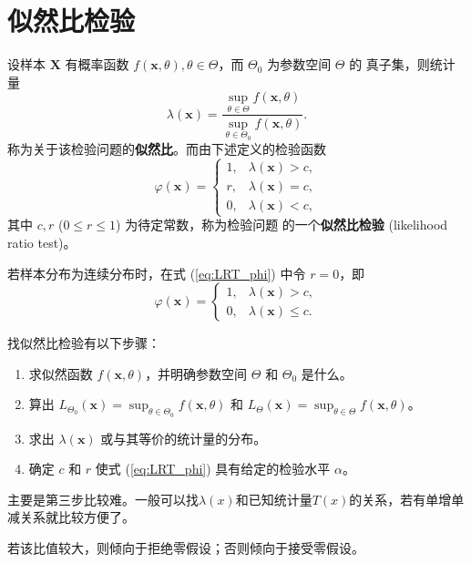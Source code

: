 \section{似然比检验}\label{sec:似然比检验}
\begin{definition}[似然比检验]\label{def:likelihood_ratio_test}
设样本 $\mathbf{X}$ 有概率函数 $f(\mathbf{x}, \theta), \theta \in \Theta$，而 $\Theta_0$ 为参数空间 $\Theta$ 的
真子集，则统计量
\begin{equation}
\lambda(\mathbf{x}) = \frac{\sup_{\theta \in \Theta} f(\mathbf{x}, \theta)}{\sup_{\theta \in \Theta_0} f(\mathbf{x}, \theta)}. \label{eq:likelihood_ratio_lambda}
\end{equation}
称为关于该检验问题的\textbf{似然比}。而由下述定义的检验函数
\begin{equation}
\varphi(\mathbf{x}) = \begin{cases}
1, & \lambda(\mathbf{x}) > c, \\
r, & \lambda(\mathbf{x}) = c, \\
0, & \lambda(\mathbf{x}) < c,
\end{cases} \label{eq:LRT_phi}
\end{equation}
其中 $c, r$ ($0 \le r \le 1$) 为待定常数，称为检验问题 的一个\textbf{似然比检验} (likelihood ratio test)。

若样本分布为连续分布时，在式 (\ref{eq:LRT_phi}) 中令 $r=0$，即
$$\varphi(\mathbf{x}) = \begin{cases}
1, & \lambda(\mathbf{x}) > c, \\
0, & \lambda(\mathbf{x}) \le c.
\end{cases}$$
\end{definition}
\begin{remark}
    找似然比检验有以下步骤：
\begin{enumerate}
    \item 求似然函数 $f(\mathbf{x}, \theta)$，并明确参数空间 $\Theta$ 和 $\Theta_0$ 是什么。
    \item 算出 $L_{\Theta_0}(\mathbf{x}) = \sup_{\theta \in \Theta_0} f(\mathbf{x}, \theta)$ 和 $L_{\Theta}(\mathbf{x}) = \sup_{\theta \in \Theta} f(\mathbf{x}, \theta)$。
    \item 求出 $\lambda(\mathbf{x})$ 或与其等价的统计量的分布。
    \item 确定 $c$ 和 $r$ 使式 (\ref{eq:LRT_phi}) 具有给定的检验水平 $\alpha$。
\end{enumerate}
主要是第三步比较难。一般可以找$\lambda(x)$和已知统计量$T(x)$的关系，若有单增单减关系就比较方便了。
\end{remark}
\begin{remark}
    若该比值较大，则倾向于拒绝零假设；否则倾向于接受零假设。
\end{remark}

